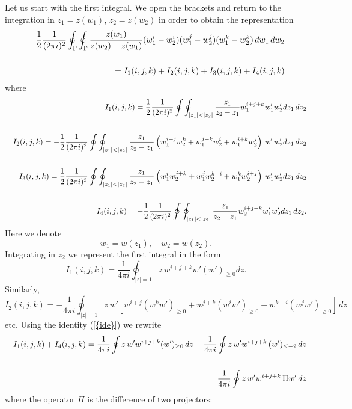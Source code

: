 \documentclass[numbook, envcountsame, envcountreset]{svjour3}
\begin{document}
Let us start with the first integral. We open the brackets and return to the integration in $z_1=z(w_1)$, $z_2=z(w_2)$ in order to obtain the representation
\begin{eqnarray}
&&
\frac12 \frac1{(2\pi i)^2} \oint_\Gamma\oint_\Gamma
\frac{z(w_1)}{z(w_2)-z(w_1)}(w_1^i-w_2^i)(w_1^j-w_2^j)(w_1^k-w_2^k) \, dw_1\, dw_2 
{\nonumber}\\
&&
{\nonumber}\\
&&
=I_1(i,j,k)+I_2(i,j,k)+I_3(i,j,k)+I_4(i,j,k)
{\nonumber}
\end{eqnarray}
where
\begin{eqnarray}
&&\label{int1}
I_1(i,j,k)=\frac12 \frac1{(2\pi i)^2} \oint\oint_{|z_1|<|z_2|} \frac{z_1}{z_2-z_1} w_1^{i+j+k} w_1' w_2' dz_1\, dz_2
{\nonumber}\\
&&
{\nonumber}\\
&&\label{int2}
I_2(i,j,k)=-\frac12 \frac1{(2\pi i)^2} \oint\oint_{|z_1|<|z_2|} \frac{z_1}{z_2-z_1} 
\left( w_1^{i+j} w_2^k + w_1^{j+k} w_2^i +w_1^{i+k} w_2^j\right) \, w_1' w_2' dz_1\, dz_2
{\nonumber}\\
&&
{\nonumber}\\
&&\label{int3}
I_3(i,j,k)=\frac12 \frac1{(2\pi i)^2} \oint\oint_{|z_1|<|z_2|} \frac{z_1}{z_2-z_1} 
\left( w_1^i w_2^{j+k} + w_1^j w_2^{k+i} + w_1^k w_2^{i+j}\right) \, w_1' w_2' dz_1\, dz_2
{\nonumber}\\
&&
{\nonumber}\\
&&\label{int4}
I_4(i,j,k) = -\frac12 \frac1{(2\pi i)^2} \oint\oint_{|z_1|<|z_2|} \frac{z_1}{z_2-z_1} 
w_2^{i+j+k} w_1' w_2' dz_1\, dz_2.
{\nonumber}
\end{eqnarray}
Here we denote
$$
w_1=w(z_1), \quad w_2 = w(z_2).
$$
Integrating in $z_2$ we represent the first integral in the form
$$
I_1(i,j,k)=\frac1{4\pi i} \oint_{|z|=1}  z\, w^{i+j+k} w' (w')_{\geq 0} dz.
$$
Similarly,
$$
I_2(i,j,k) =-\frac1{4\pi i} \oint_{|z|=1}  z\,w'  \left[ w^{i+j} (w^k w')_{\geq 0} + w^{j+k} (w^i w')_{\geq 0} + w^{k+i} (w^j w')_{\geq 0} \right]\, dz
$$
etc. Using the identity {(\ref{{ide}})} we rewrite
\begin{eqnarray}
&&
I_1(i,j,k)+I_4(i,j,k)=\frac1{4\pi i} \oint z\, w'  w^{i+j+k} (w')_{\geq 0} \,dz-\frac1{4\pi i} \oint z\, w'w^{i+j+k}\,(w')_{\leq -2}\,  dz
{\nonumber}\\
&&
{\nonumber}\\
&&
=\frac1{4\pi i} \oint z\, w'  w^{i+j+k}\,\Pi w'\, dz
{\nonumber}
\end{eqnarray}
where the operator $\Pi$ is the difference of two projectors:
\end{document}
